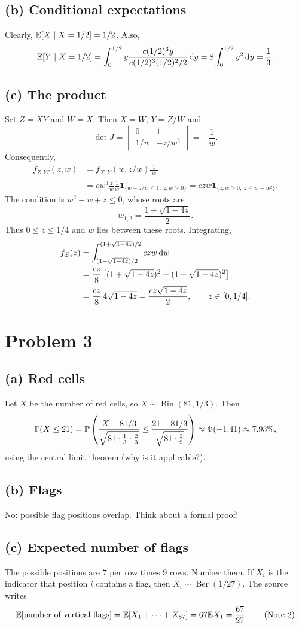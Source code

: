 \documentclass[11pt,a4paper]{article}
\begin{document}
\subsection*{(b) Conditional expectations}
Clearly, $\E[X\mid X=1/2]=1/2$. Also,
\[
\E[Y\mid X=1/2]
=\int_0^{1/2}y\frac{c(1/2)^3y}{c(1/2)^3(1/2)^2/2}\d y
=8\int_0^{1/2}y^2\d y=\frac13.
\]
\subsection*{(c) The product}
Set $Z=XY$ and $W=X$. Then $X=W$, $Y=Z/W$ and
\[
\det J=\begin{vmatrix}0&1\\1/w&-z/w^2\end{vmatrix}=-\frac1w.
\]
Consequently,
\begin{align*}
f_{Z,W}(z,w)&=f_{X,Y}(w,z/w)\frac1{|w|}\\
&=cw^3\frac zw\frac1w\mathbf1_{\{w+z/w\le1,\ z,w\ge0\}}
=czw\mathbf1_{\{z,w\ge0,\ z\le w-w^2\}}.
\end{align*}
The condition is $w^2-w+z\le0$, whose roots are
\[
w_{1,2}=\frac{1\mp\sqrt{1-4z}}2.
\]
Thus $0\le z\le1/4$ and $w$ lies between these roots. Integrating,
\begin{align*}
f_Z(z)&=\int_{(1-\sqrt{1-4z})/2}^{(1+\sqrt{1-4z})/2}czw\d w\\
&=\frac{cz}{8}\left[(1+\sqrt{1-4z})^2-(1-\sqrt{1-4z})^2\right]\\
&=\frac{cz}{8}\,4\sqrt{1-4z}=\frac{cz\sqrt{1-4z}}2,
\qquad z\in[0,1/4].
\end{align*}

\section*{Problem 3}
\subsection*{(a) Red cells}
Let $X$ be the number of red cells, so $X\sim\operatorname{Bin}(81,1/3)$. Then
\[
\P(X\le21)=\P\left(\frac{X-81/3}{\sqrt{81\cdot\frac13\cdot\frac23}}
\le\frac{21-81/3}{\sqrt{81\cdot\frac29}}\right)
\approx\Phi(-1.41)\approx7.93\%,
\]
using the central limit theorem (why is it applicable?).
\subsection*{(b) Flags}
No: possible flag positions overlap. Think about a formal proof!
\subsection*{(c) Expected number of flags}
The possible positions are $7$ per row times $9$ rows. Number them. If $X_i$ is the indicator that position $i$ contains a flag, then $X_i\sim\operatorname{Ber}(1/27)$. The source writes
\[
\E[\text{number of vertical flags}]
=\E[X_1+\cdots+X_{67}]=67\E X_1=\frac{67}{27}.\tag{Note 2}
\]
\end{document}
